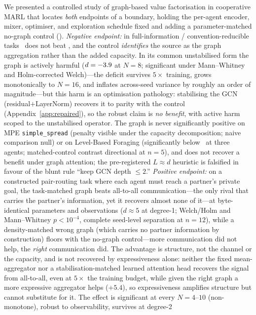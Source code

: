 We presented a controlled study of graph-based value factorisation in
cooperative MARL that locates \emph{both} endpoints of a boundary, holding
the per-agent encoder, mixer, optimiser, and exploration schedule fixed and
adding a parameter-matched no-graph control (\mlpqmix). \emph{Negative
endpoint:} in full-information / convention-reducible tasks \gnnqmix\ does not
beat \qmix, and the control \emph{identifies} the source as the graph
aggregation rather than the added capacity. In its common unstabilised form
the graph is actively harmful ($d=-3.9$ at $N{=}8$;
significant under Mann--Whitney and Holm-corrected Welch)---the deficit
survives $5\times$ training, grows monotonically to $N{=}16$, and inflates
across-seed variance by roughly an order of magnitude---but this harm is an
optimisation pathology: stabilising the GCN (residual$+$LayerNorm) recovers
it to parity with the control (Appendix~\ref{app:repaired}), so the robust
claim is \emph{no benefit}, with active harm scoped to the unstabilised
operator. The graph is never significantly positive on MPE
\texttt{simple\_spread} (penalty visible under
the capacity decomposition; naive comparison null) or on Level-Based Foraging
(significantly below \qmix\ at three agents; matched-control contrast
directional at $n{=}5$), and does not recover a benefit under graph
attention; the pre-registered
$L\approx d$ heuristic is falsified in favour of the blunt rule ``keep GCN
depth $\le 2$.'' \emph{Positive endpoint:} on a constructed pair-routing task
where each agent must reach a partner's private goal, the task-matched graph
beats all-to-all communication---the only rival that carries the partner's
information, yet it recovers almost none of it---at byte-identical
parameters and observations
($d\approx5$ at degree-1; Welch/Holm and Mann--Whitney $p<10^{-4}$, complete
seed-level separation at $n{=}12$), while a density-matched wrong graph
(which carries no partner information by construction) floors with the no-graph
control---more communication did not help, the \emph{right} communication did.
The advantage is structure, not the channel or the capacity, and is not
recovered by expressiveness alone: neither the fixed mean-aggregator nor a
stabilisation-matched learned attention head recovers the signal from
all-to-all, even at $5\times$ the training budget, while given the right graph a more expressive
aggregator helps ($+5.4$), so expressiveness amplifies structure but cannot
substitute for it. The effect is significant at every
$N{=}4$--$10$ (non-monotone), robust to observability, survives at degree-2
